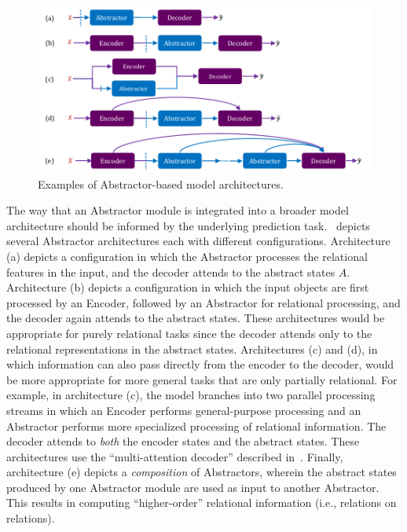 \begin{figure}
    \centering
    \includegraphics[width=.8\textwidth]{figures/abstractor_architectures.pdf}
    \caption{Examples of Abstractor-based model architectures.}\label{fig:abstractor_architectures}
    \vskip-10pt
\end{figure}


The way that an Abstractor module is integrated into a broader model architecture should be informed by the underlying prediction task.~ depicts several Abstractor architectures each with different configurations. Architecture (a) depicts a configuration in which the Abstractor processes the relational features in the input, and the decoder attends to the abstract states $A$. Architecture (b) depicts a configuration in which the input objects are first processed by an Encoder, followed by an Abstractor for relational processing, and the decoder again attends to the abstract states. These architectures would be appropriate for purely relational tasks since the decoder attends only to the relational representations in the abstract states. Architectures (c) and (d), in which information can also pass directly from the encoder to the decoder, would be more appropriate for more general tasks that are only partially relational. For example, in architecture (c), the model branches into two parallel processing streams in which an Encoder performs general-purpose processing and an Abstractor performs more specialized processing of relational information. The decoder attends to \textit{both} the encoder states and the abstract states.
These architectures use the ``multi-attention decoder'' described in~.
Finally, architecture (e) depicts a \textit{composition} of Abstractors, wherein the abstract states produced by one Abstractor module are used as input to another Abstractor. This results in computing ``higher-order'' relational information (i.e., relations on relations).